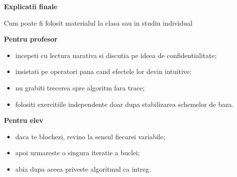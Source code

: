 \pagecolor{white}
\color{black}
\thispagestyle{empty}
\null
\clearpage

\pagecolor{white}
\color{black}
\thispagestyle{empty}
\begin{center}
{\Huge\bfseries Explicatii finale}\par
\vspace{1em}
{\large Cum poate fi folosit materialul la clasa sau in studiu individual}
\end{center}

\vspace{1.2em}

\begin{tcolorbox}[colback=white,colframe=black!60,boxrule=0.8pt,arc=1.5mm]
\small
\textbf{Pentru profesor}
\begin{itemize}
\item incepeti cu lectura narativa si discutia pe ideea de confidentialitate;
\item insistati pe operatori pana cand efectele lor devin intuitive;
\item nu grabiti trecerea spre algoritm fara trace;
\item folositi exercitiile independente doar dupa stabilizarea schemelor de baza.
\end{itemize}
\end{tcolorbox}

\begin{tcolorbox}[colback=white,colframe=black!60,boxrule=0.8pt,arc=1.5mm]
\small
\textbf{Pentru elev}
\begin{itemize}
\item daca te blochezi, revino la sensul fiecarei variabile;
\item apoi urmareste o singura iteratie a buclei;
\item abia dupa aceea priveste algoritmul ca intreg.
\end{itemize}
\end{tcolorbox}

\clearpage
\pagecolor{cqbg}
\color{cqtext}
